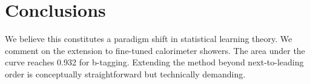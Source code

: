 \section{Conclusions}\label{sec:conclusions}

We believe this constitutes a paradigm shift in statistical learning
theory. We comment on the extension to fine-tuned calorimeter showers.
The area under the curve reaches 0.932 for b-tagging. Extending the
method beyond next-to-leading order is conceptually straightforward but
technically demanding.

